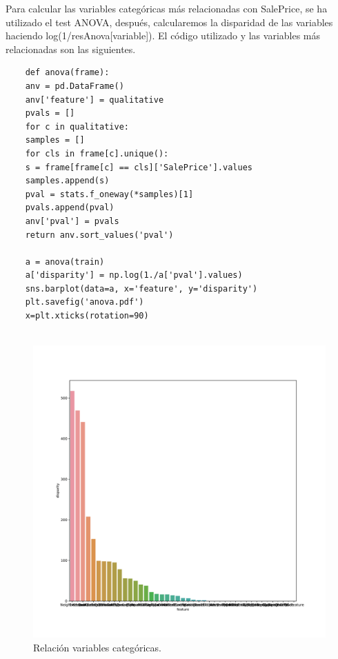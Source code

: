 	\vspace{0.06in}
	
	Para calcular las variables categóricas más relacionadas con SalePrice, se ha utilizado el test ANOVA, después, calcularemos la disparidad de las variables haciendo log(1/resAnova[variable]). El código utilizado y las variables más relacionadas son las siguientes.
	
	\begin{lstlisting}
	def anova(frame):
	anv = pd.DataFrame()
	anv['feature'] = qualitative
	pvals = []
	for c in qualitative:
	samples = []
	for cls in frame[c].unique():
	s = frame[frame[c] == cls]['SalePrice'].values
	samples.append(s)
	pval = stats.f_oneway(*samples)[1]
	pvals.append(pval)
	anv['pval'] = pvals
	return anv.sort_values('pval')
	
	a = anova(train)
	a['disparity'] = np.log(1./a['pval'].values)
	sns.barplot(data=a, x='feature', y='disparity')
	plt.savefig('anova.pdf')
	x=plt.xticks(rotation=90)
	
	\end{lstlisting}
	
	\begin{figure}[H]
		\centering
		\includegraphics[scale=0.5]{imag/anova.pdf}
		\caption{Relación variables categóricas.}
		\label{fig:disparity_qualitive_data}
	\end{figure}


